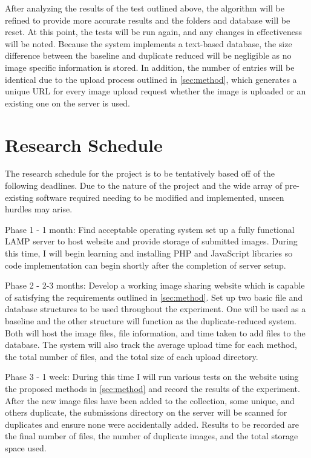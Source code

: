 \documentclass[11pt]{article}
\begin{document}
After analyzing the results of the test outlined above, the algorithm will be refined to provide more accurate results and the folders and database will be reset. At this point, the tests will be run again, and any changes in effectiveness will be noted. Because the system implements a text-based database, the size difference between the baseline and duplicate reduced will be negligible as no image specific information is stored. In addition, the number of entries will be identical due to the upload process outlined in \ref{sec:method}, which generates a unique URL for every image upload request whether the image is uploaded or an existing one on the server is used.

\vspace*{-.1in}
\section{Research Schedule}
\label{sec:schedule}
\vspace*{-.1in}

The research schedule for the project is to be tentatively based off of the following deadlines.
Due to the nature of the project and the wide array of pre-existing software required needing to
be modified and implemented, unseen hurdles may arise.

Phase 1 - 1 month: Find acceptable operating system set up a fully functional LAMP server to host website and provide storage of submitted images. During this time, I will begin learning and installing PHP and JavaScript libraries so code implementation can begin shortly after the completion of server setup.

Phase 2 - 2-3 months: Develop a working image sharing website which is capable of satisfying the requirements
outlined in \ref{sec:method}. Set up two basic file and database structures to be used throughout the experiment. One will be used as a baseline and the other structure will function as the duplicate-reduced system. Both will host the image files, file information, and time taken to add files to the database. The system will also track the average upload time for each method, the total number of files, and the total size of each upload directory.

Phase 3 - 1 week: During this time I will run various tests on the website using the proposed
methods in \ref{sec:method} and record the results of the experiment. After the new image files have been added to the collection, some unique, and others duplicate, the submissions directory on the server will be scanned for  duplicates and ensure none were accidentally added. Results to be recorded are the final number of files, the number of duplicate images, and the total storage space used.
\end{document}
